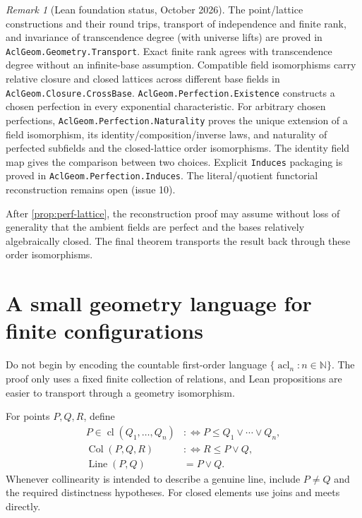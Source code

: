 \documentclass[11pt,oneside]{article}
\theoremstyle{definition}
\theoremstyle{remark}
\newtheorem{remark}[theorem]{Remark}
\newcommand{\acl}{\operatorname{acl}}
\newcommand{\cl}{\operatorname{cl}}
\newcommand{\lean}[1]{\nolinkurl{#1}}
\begin{document}
\begin{remark}[Lean foundation status, October 2026]
The point/lattice constructions and their round trips, transport of independence and finite
rank, and invariance of transcendence degree (with universe lifts) are proved in
\lean{AclGeom.Geometry.Transport}.  Exact finite rank agrees with transcendence degree
without an infinite-base assumption.  Compatible field isomorphisms carry relative closure
and closed lattices across different base fields in \lean{AclGeom.Closure.CrossBase}.
\lean{AclGeom.Perfection.Existence} constructs a chosen perfection in every exponential
characteristic.  For arbitrary chosen perfections, \lean{AclGeom.Perfection.Naturality}
proves the unique extension of a field isomorphism, its identity/composition/inverse laws,
and naturality of perfected subfields and the closed-lattice order isomorphisms.  The
identity field map gives the comparison between two choices.  Explicit \lean{Induces}
packaging is proved in \lean{AclGeom.Perfection.Induces}.  The literal/quotient functorial
reconstruction remains open (issue 10).
\end{remark}

After \cref{prop:perf-lattice}, the reconstruction proof may assume without loss of
generality that the ambient fields are perfect and the bases relatively algebraically
closed.  The final theorem transports the result back through these order isomorphisms.

\section{A small geometry language for finite configurations}

Do not begin by encoding the countable first-order language
$\{\acl_n:n\in\mathbb N\}$.  The proof only uses a fixed finite collection of relations,
and Lean propositions are easier to transport through a geometry isomorphism.

For points $P,Q,R$, define
\[
\begin{aligned}
  P\in\cl(Q_1,\ldots,Q_n)&:\Longleftrightarrow
       P\leq Q_1\vee\cdots\vee Q_n,\\
  \operatorname{Col}(P,Q,R)&:\Longleftrightarrow
       R\leq P\vee Q,\\
  \operatorname{Line}(P,Q)&=P\vee Q.
\end{aligned}
\]
Whenever collinearity is intended to describe a genuine line, include $P\neq Q$ and
the required distinctness hypotheses.  For closed elements use joins and meets directly.
\end{document}
